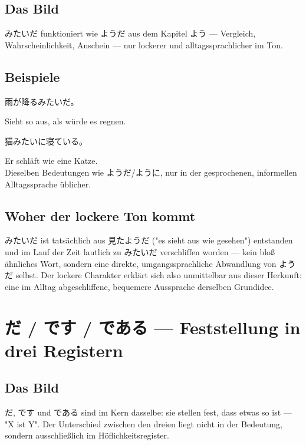 \documentclass[12pt]{book}
\begin{document}
\section*{Das Bild}

みたいだ funktioniert wie ようだ aus dem Kapitel よう — Vergleich, Wahrscheinlichkeit, Anschein — nur lockerer und alltagssprachlicher im Ton.

\section*{Beispiele}

\par\quad 雨が降るみたいだ。\\
\par\quad Sieht so aus, als würde es regnen.\\

\par\quad 猫みたいに寝ている。\\
\par\quad Er schläft wie eine Katze.\\

Dieselben Bedeutungen wie ようだ/ように, nur in der gesprochenen, informellen Alltagssprache üblicher.

\section*{Woher der lockere Ton kommt}

みたいだ ist tatsächlich aus 見たようだ ("es sieht aus wie gesehen") entstanden und im Lauf der Zeit lautlich zu みたいだ verschliffen worden — kein bloß ähnliches Wort, sondern eine direkte, umgangssprachliche Abwandlung von ようだ selbst. Der lockere Charakter erklärt sich also unmittelbar aus dieser Herkunft: eine im Alltag abgeschliffene, bequemere Aussprache derselben Grundidee.


\chapter{だ / です / である — Feststellung in drei Registern}

\section*{Das Bild}

だ, です und である sind im Kern dasselbe: sie stellen fest, dass etwas so ist — "X ist Y". Der Unterschied zwischen den dreien liegt nicht in der Bedeutung, sondern ausschließlich im Höflichkeitsregister.
\end{document}
